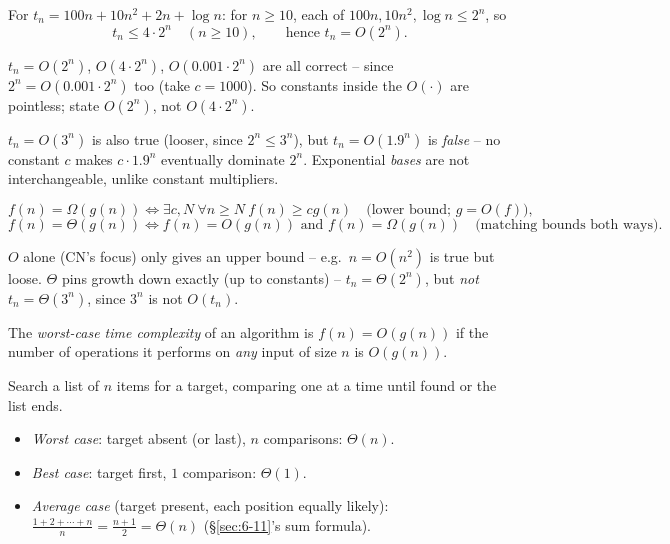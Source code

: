 \documentclass[11pt]{article}
\begin{document}
\begin{example}
For $t_n = 100n+10n^2+2n+\log n$: for $n\ge10$, each of $100n,10n^2,\log n \le 2^n$, so
\[
t_n \le 4\cdot2^n \quad (n\ge10), \qquad \text{hence } t_n = O(2^n).
\]
\end{example}

\begin{note}
$t_n=O(2^n)$, $O(4\cdot2^n)$, $O(0.001\cdot2^n)$ are all correct -- since $2^n=O(0.001\cdot2^n)$ too (take $c=1000$). So constants inside the $O(\cdot)$ are pointless; state $O(2^n)$, not $O(4\cdot2^n)$.
\end{note}

\begin{note}
$t_n=O(3^n)$ is also true (looser, since $2^n\le3^n$), but $t_n=O(1.9^n)$ is \emph{false} -- no constant $c$ makes $c\cdot1.9^n$ eventually dominate $2^n$. Exponential \emph{bases} are not interchangeable, unlike constant multipliers.
\end{note}

\bigskip
\begin{definition}
\[
f(n)=\Omega(g(n)) \iff \exists c,N\ \forall n\ge N\ f(n)\ge cg(n) \quad\text{(lower bound; } g=O(f)\text{)},
\]
\[
f(n)=\Theta(g(n)) \iff f(n)=O(g(n)) \text{ and } f(n)=\Omega(g(n)) \quad\text{(matching bounds both ways)}.
\]
\end{definition}

\begin{note}
$O$ alone (CN's focus) only gives an upper bound -- e.g.\ $n=O(n^2)$ is true but loose. $\Theta$ pins growth down exactly (up to constants) -- $t_n=\Theta(2^n)$, but \emph{not} $t_n=\Theta(3^n)$, since $3^n$ is not $O(t_n)$.
\end{note}

\bigskip
\begin{definition}
The \emph{worst-case time complexity} of an algorithm is $f(n)=O(g(n))$ if the number of operations it performs on \emph{any} input of size $n$ is $O(g(n))$.
\end{definition}

\begin{example}
Search a list of $n$ items for a target, comparing one at a time until found or the list ends.
\begin{itemize}
    \item \emph{Worst case}: target absent (or last), $n$ comparisons: $\Theta(n)$.
    \item \emph{Best case}: target first, $1$ comparison: $\Theta(1)$.
    \item \emph{Average case} (target present, each position equally likely): $\frac{1+2+\cdots+n}{n}=\frac{n+1}{2}=\Theta(n)$ (\S\ref{sec:6-11}'s sum formula).
\end{itemize}
\end{example}
\end{document}
